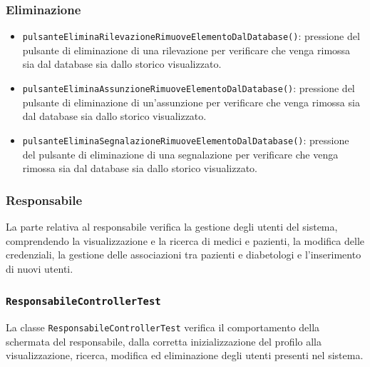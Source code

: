 \subsubsection*{Eliminazione}

\begin{itemize}
	
	\item \texttt{pulsanteEliminaRilevazioneRimuoveElementoDalDatabase()}: pressione del pulsante di eliminazione di una rilevazione per verificare che venga rimossa sia dal database sia dallo storico visualizzato.
	
	\item \texttt{pulsanteEliminaAssunzioneRimuoveElementoDalDatabase()}: pressione del pulsante di eliminazione di un'assunzione per verificare che venga rimossa sia dal database sia dallo storico visualizzato.
	
	\item \texttt{pulsanteEliminaSegnalazioneRimuoveElementoDalDatabase()}: pressione del pulsante di eliminazione di una segnalazione per verificare che venga rimossa sia dal database sia dallo storico visualizzato.
	
\end{itemize}

\subsubsection*{Responsabile}

La parte relativa al responsabile verifica la gestione degli utenti del sistema, comprendendo la visualizzazione e la ricerca di medici e pazienti, la modifica delle credenziali, la gestione delle associazioni tra pazienti e diabetologi e l'inserimento di nuovi utenti.

\subsubsection*{\texttt{ResponsabileControllerTest}}

La classe \texttt{ResponsabileControllerTest} verifica il comportamento della schermata del responsabile, dalla corretta inizializzazione del profilo alla visualizzazione, ricerca, modifica ed eliminazione degli utenti presenti nel sistema.

